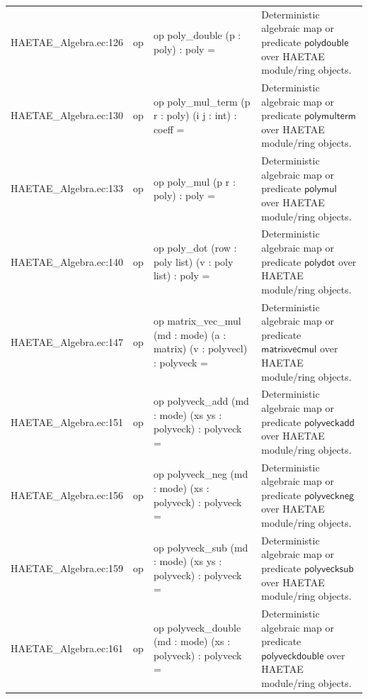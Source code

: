 \documentclass[10pt]{article}
\begin{document}
\begin{longtable}{L{0.11\textwidth}L{0.055\textwidth}L{0.385\textwidth}L{0.41\textwidth}}
HAETAE\_\allowbreak{}Algebra.\allowbreak{}ec:\allowbreak{}126 & op & {\ttfamily\scriptsize op poly\_\allowbreak{}double (p : poly) : poly =} & Deterministic algebraic map or predicate $\mathsf{polydouble}$ over HAETAE module/ring objects. \\
HAETAE\_\allowbreak{}Algebra.\allowbreak{}ec:\allowbreak{}130 & op & {\ttfamily\scriptsize op poly\_\allowbreak{}mul\_\allowbreak{}term (p r : poly) (i j : int) : coeff =} & Deterministic algebraic map or predicate $\mathsf{polymulterm}$ over HAETAE module/ring objects. \\
HAETAE\_\allowbreak{}Algebra.\allowbreak{}ec:\allowbreak{}133 & op & {\ttfamily\scriptsize op poly\_\allowbreak{}mul (p r : poly) : poly =} & Deterministic algebraic map or predicate $\mathsf{polymul}$ over HAETAE module/ring objects. \\
HAETAE\_\allowbreak{}Algebra.\allowbreak{}ec:\allowbreak{}140 & op & {\ttfamily\scriptsize op poly\_\allowbreak{}dot (row : poly list) (v : poly list) : poly =} & Deterministic algebraic map or predicate $\mathsf{polydot}$ over HAETAE module/ring objects. \\
HAETAE\_\allowbreak{}Algebra.\allowbreak{}ec:\allowbreak{}147 & op & {\ttfamily\scriptsize op matrix\_\allowbreak{}vec\_\allowbreak{}mul (md : mode) (a : matrix) (v : polyvecl) : polyveck =} & Deterministic algebraic map or predicate $\mathsf{matrixvecmul}$ over HAETAE module/ring objects. \\
HAETAE\_\allowbreak{}Algebra.\allowbreak{}ec:\allowbreak{}151 & op & {\ttfamily\scriptsize op polyveck\_\allowbreak{}add (md : mode) (xs ys : polyveck) : polyveck =} & Deterministic algebraic map or predicate $\mathsf{polyveckadd}$ over HAETAE module/ring objects. \\
HAETAE\_\allowbreak{}Algebra.\allowbreak{}ec:\allowbreak{}156 & op & {\ttfamily\scriptsize op polyveck\_\allowbreak{}neg (md : mode) (xs : polyveck) : polyveck =} & Deterministic algebraic map or predicate $\mathsf{polyveckneg}$ over HAETAE module/ring objects. \\
HAETAE\_\allowbreak{}Algebra.\allowbreak{}ec:\allowbreak{}159 & op & {\ttfamily\scriptsize op polyveck\_\allowbreak{}sub (md : mode) (xs ys : polyveck) : polyveck =} & Deterministic algebraic map or predicate $\mathsf{polyvecksub}$ over HAETAE module/ring objects. \\
HAETAE\_\allowbreak{}Algebra.\allowbreak{}ec:\allowbreak{}161 & op & {\ttfamily\scriptsize op polyveck\_\allowbreak{}double (md : mode) (xs : polyveck) : polyveck =} & Deterministic algebraic map or predicate $\mathsf{polyveckdouble}$ over HAETAE module/ring objects. \\

\end{longtable}
\end{document}

